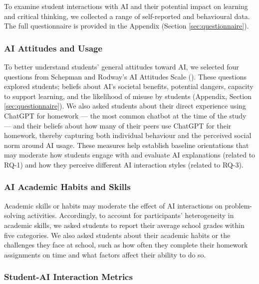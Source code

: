 \documentclass[
  12pt,
]{article}
\begin{document}
To examine student interactions with AI and their potential impact on learning and critical thinking, we collected a range of self-reported and behavioural data. The full questionnaire is provided in the Appendix (Section \ref{sec:questionnaire}).

\subsubsection{AI Attitudes and Usage}\label{ai-attitudes-and-usage}

To better understand students' general attitudes toward AI, we selected four questions from Schepman and Rodway's AI Attitudes Scale (). These questions explored students; beliefs about AI's societal benefits, potential dangers, capacity to support learning, and the likelihood of misuse by students (Appendix, Section \ref{sec:questionnaire}). We also asked students about their direct experience using ChatGPT for homework --- the most common chatbot at the time of the study --- and their beliefs about how many of their peers use ChatGPT for their homework, thereby capturing both individual behaviour and the perceived social norm around AI usage. These measures help establish baseline orientations that may moderate how students engage with and evaluate AI explanations (related to RQ-1) and how they perceive different AI interaction styles (related to RQ-3).

\subsubsection{AI Academic Habits and Skills}\label{ai-academic-habits-and-skills}

Academic skills or habits may moderate the effect of AI interactions on problem-solving activities. Accordingly, to account for participants' heterogeneity in academic skills, we asked students to report their average school grades within five categories. We also asked students about their academic habits or the challenges they face at school, such as how often they complete their homework assignments on time and what factors affect their ability to do so.

\subsubsection{Student-AI Interaction Metrics}\label{student-ai-interaction-metrics}
\end{document}
